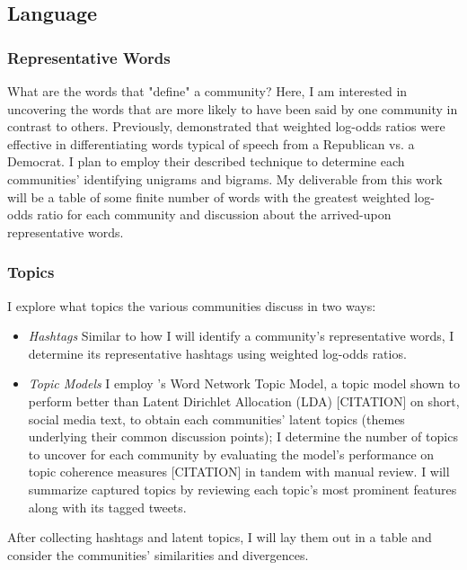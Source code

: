\documentclass[acmlarge, screen, authorversion]{acmart}
\begin{document}
\subsection{Language}

\subsubsection{Representative Words}

What are the words that "define" a community? Here, I am interested in
uncovering the words that are more likely to have been said by one community in
contrast to others. Previously, \citet{monroeFightinWordsLexical2008}
demonstrated that weighted log-odds ratios were effective in differentiating
words typical of speech from a Republican vs. a Democrat. I plan to employ their
described technique to determine each communities' identifying unigrams and
bigrams. My deliverable from this work will be a table of some finite number of
words with the greatest weighted log-odds ratio for each community and
discussion about the arrived-upon representative words.
\subsubsection{Topics}

I explore what topics the various communities discuss in two ways:

\begin{itemize}
	\item \textit{Hashtags} Similar to how I will identify a community's representative words, I determine its representative hashtags using weighted log-odds ratios.

	\item \textit{Topic Models} I employ \citet{zuoWordNetworkTopic2016}'s Word
	Network Topic Model, a topic model shown to perform better than Latent
	Dirichlet Allocation (LDA) [CITATION] on short, social media text, to obtain
	each communities' latent topics (themes underlying their common discussion
	points); I determine the number of topics to uncover for each community by
	evaluating the model's performance on topic coherence measures [CITATION] in
	tandem with manual review. I will summarize captured topics by reviewing each
	topic's most prominent features along with its tagged tweets.

\end{itemize}

After collecting hashtags and latent topics, I will lay them out in a table and
consider the communities' similarities and divergences.
\end{document}
